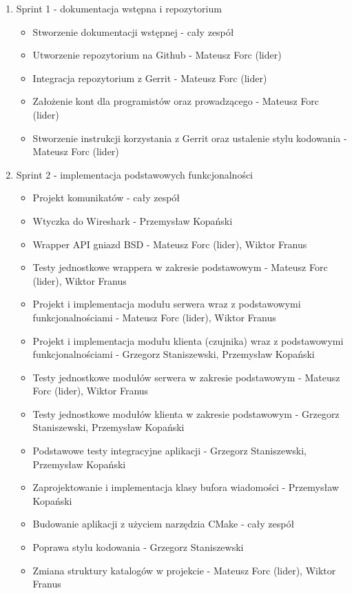 \documentclass[a4paper,11pt]{article}
\begin{document}
\begin{enumerate}
\item Sprint 1 - dokumentacja wstępna i repozytorium
\begin{itemize}
\item Stworzenie dokumentacji wstępnej - cały zespół
\item Utworzenie repozytorium na Github - Mateusz Forc (lider)
\item Integracja repozytorium z Gerrit - Mateusz Forc (lider)
\item Założenie kont dla programistów oraz prowadzącego - Mateusz Forc (lider)
\item Stworzenie instrukcji korzystania z Gerrit oraz ustalenie stylu kodowania
      - Mateusz Forc (lider)
\end{itemize}
\item Sprint 2 - implementacja podstawowych funkcjonalności
\begin{itemize}
\item Projekt komunikatów - cały zespół
\item Wtyczka do Wireshark - Przemysław Kopański
\item Wrapper API gniazd BSD - Mateusz Forc (lider), Wiktor Franus
\item Testy jednostkowe wrappera w zakresie podstawowym - Mateusz Forc (lider), Wiktor Franus
\item Projekt i implementacja modułu serwera wraz z podstawowymi funkcjonalnościami
      - Mateusz Forc (lider), Wiktor Franus
\item Projekt i implementacja modułu klienta (czujnika) wraz z podstawowymi funkcjonalnościami
      - Grzegorz Staniszewski, Przemysław Kopański
\item Testy jednostkowe modułów serwera w zakresie podstawowym - Mateusz Forc (lider), Wiktor Franus
\item Testy jednostkowe modułów klienta w zakresie podstawowym
      - Grzegorz Staniszewski, Przemysław Kopański
\item Podstawowe testy integracyjne aplikacji - Grzegorz Staniszewski, Przemysław Kopański
\item Zaprojektowanie i implementacja klasy bufora wiadomości - Przemysław Kopański
\item Budowanie aplikacji z użyciem narzędzia CMake - cały zespół
\item Poprawa stylu kodowania - Grzegorz Staniszewski
\item Zmiana struktury katalogów w projekcie - Mateusz Forc (lider), Wiktor Franus

\end{itemize}
\end{enumerate}
\end{document}
